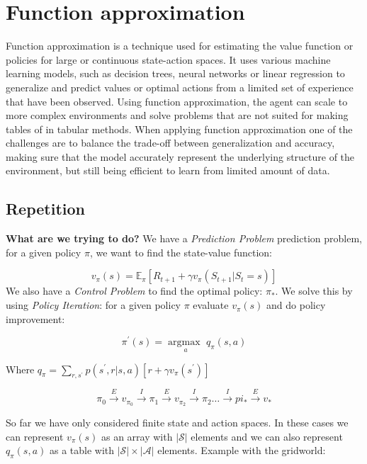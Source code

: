 
\section{Function approximation}
Function approximation is a technique used for estimating the value function or policies for large or continuous state-action spaces. It uses various machine learning models, such as decision trees, neural networks or linear regression to generalize and predict values or optimal actions from a limited set of experience that have been observed. Using function approximation, the agent can scale to more complex environments and solve problems that are not suited for making tables of in tabular methods. When applying function approximation one of the challenges are to balance the trade-off between generalization and accuracy, making sure that the model accurately represent the underlying structure of the environment, but still being efficient to learn from limited amount of data. 

\subsection*{Repetition}
\textbf{What are we trying to do?} We have a \emph{Prediction Problem} prediction problem, for a given policy $\pi$, we want to find the state-value function:

	\begin{equation}
		v_\pi(s) = \mathbb{E}_\pi[R_{t+1} + \gamma v_\pi (S_{t+1}|S_t=s)]
	\end{equation}
We also have a \emph{Control Problem} to find the optimal policy: $\pi_*$. We solve this by using \emph{Policy Iteration}: for a given policy $\pi$ evaluate $v_\pi(s)$ and do policy improvement:

	\begin{equation}
		\pi^{\prime}(s) = \underset{a}{\arg \text{max }}q_\pi(s,a)
	\end{equation}

Where $q_\pi = \sum_{r,s^{\prime}}^{}p(s^{\prime},r|s,a) [r + \gamma v_\pi(s^{\prime})] $

	\begin{equation}
		\pi_0 \overset{E}{\rightarrow}v_{\pi_0} \overset{I}{\rightarrow} \pi_1 \overset{E}{\rightarrow} v_{\pi_2} \overset{I}{\rightarrow} \pi_2 \ldots \overset{I}{\rightarrow} pi_* \overset{E}{\rightarrow} v_*	
	\end{equation}

So far we have only considered finite state and action spaces. In these cases we can represent $v_\pi(s)$ as an array with $|\mathcal{S}|$ elements and we can also represent $q_\pi(s,a)$ as a table with $|\mathcal{S}| \times |\mathcal{A}|$ elements. Example with the gridworld:

